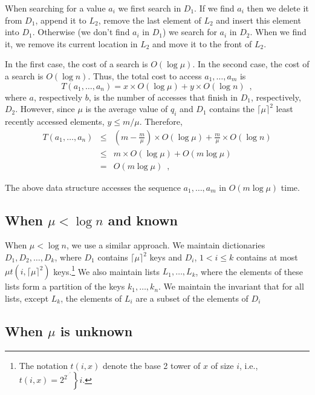 \documentclass[lotsofwhite,ccfonts]{patmorin}
\begin{document}
When searching for a value $a_i$ we first search in $D_1$. If we find
$a_i$ then we delete it from $D_1$, append it to $L_2$, remove the
last element of $L_2$ and insert this element into $D_1$.  Otherwise
(we don't find $a_i$ in $D_1$) we search for $a_i$ in $D_2$.  When we
find it, we remove its current location in $L_2$ and move it to the
front of $L_2$.

In the first case, the cost of a search is $O(\log\mu)$.  In the
second case, the cost of a search is $O(\log n)$.  Thus, the total
cost to access $a_1,\ldots,a_m$ is
\[
  T(a_1,\ldots,a_n) = x\times O(\log \mu) + y\times O(\log n) \enspace ,
\]
where $a$, respectively $b$, is the number of accesses that finish in
$D_1$, respectively, $D_2$.  However, since $\mu$ is the average value
of $q_i$ and $D_1$ contains the $\lceil\mu\rceil^2$ least recently
accessed elements, $y\le m/\mu$.  Therefore,
\begin{eqnarray*}
  T(a_1,\ldots,a_n) & \le & \left(m-\frac{m}{\mu}\right)\times O(\log \mu) 
	+ \frac{m}{\mu}\times O(\log n) \\
	& \le & m\times O(\log\mu) + O(m\log\mu) \\
	& = & O(m\log \mu) \enspace ,
\end{eqnarray*}

\begin{thm}
The above data structure accesses the sequence $a_1,\ldots,a_m$ in
$O(m\log\mu)$ time.
\end{thm}

\subsection{When $\mu < \log n$ and known}

When $\mu<\log n$, we use a similar approach.  We maintain
dictionaries $D_1,D_2,\ldots,D_k$, where $D_1$ contains
$\lceil\mu\rceil^2$ keys and $D_i$, $1<i\le k$ contains at most $\mu
t(i,\lceil\mu\rceil^2)$ keys.\footnote{The notation $t(i,x)$ denote
the base 2 tower of $x$ of size $i$, i.e.,
$t(i,x)=\left.2^{2^{\cdot^{\cdot^{\cdot^x}}}}\right\}i$.} We also
maintain lists $L_1,\ldots,L_k$, where the elements of these lists
form a partition of the keys $k_1,\ldots,k_n$.  We maintain the invariant that for all lists, except $L_k$, the elements of $L_i$ are a subset of the elements of $D_i$



\subsection{When $\mu$ is unknown}

 
\end{document}
